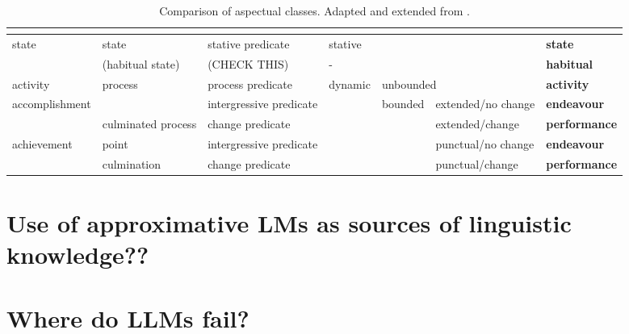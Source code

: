 \begin{table}[]
    \begin{adjustbox}{width=\textwidth}
    \begin{tabular}{|l|l|l|l|l|l|l|}
    \hline
    \citet*{vendler57} &  \citet*{moens-steedman-1988-temporal}& \citet*{egg2005flexible} & \multicolumn{3}{l}{\citet*{annotAndAutoClassOfAspectCat}}  \vline & \citet{umr} \\ \hline \hline
\multirow{2}{*}{state}         & state                      & stative predicate     & \multicolumn{3}{l}{stative} \vline & \textbf{state} \\ \cline{2-7}
                               & (habitual state)           & (CHECK THIS)          & \multicolumn{3}{l}{-} \vline & \textbf{habitual} \\ \hline
activity                       & \multirow{2}{*}{process}   & process predicate     & \multirow{5}{*}{dynamic} & \multicolumn{2}{l}{unbounded} \vline & \textbf{activity} \\ \cline{1-1}\cline{3-3}\cline{5-7}
\multirow{2}{*}{accomplishment}&                            & intergressive predicate&      & \multirow{4}{*}{bounded} &  extended/no change & \textbf{endeavour} \\ \cline{2-3}\cline{6-7}
                               & culminated process         & change predicate      &       &  & extended/change & \textbf{performance}\\ \cline{1-3}\cline{6-7}
\multirow{2}{*}{achievement}   & point                      & intergressive predicate&      &  & punctual/no change & \textbf{endeavour} \\ \cline{2-3} \cline{6-7}
                               & culmination                & change predicate      &       &  & punctual/change & \textbf{performance} \\ \hline

    \end{tabular}
    \end{adjustbox}
    \caption{Comparison of aspectual classes. Adapted and extended from \citet*{annotAndAutoClassOfAspectCat}.}
    \label{table:aspect_classes_comparison}
\end{table}


\section{Use of approximative LMs as sources of linguistic knowledge??}
\section{Where do LLMs fail?}


